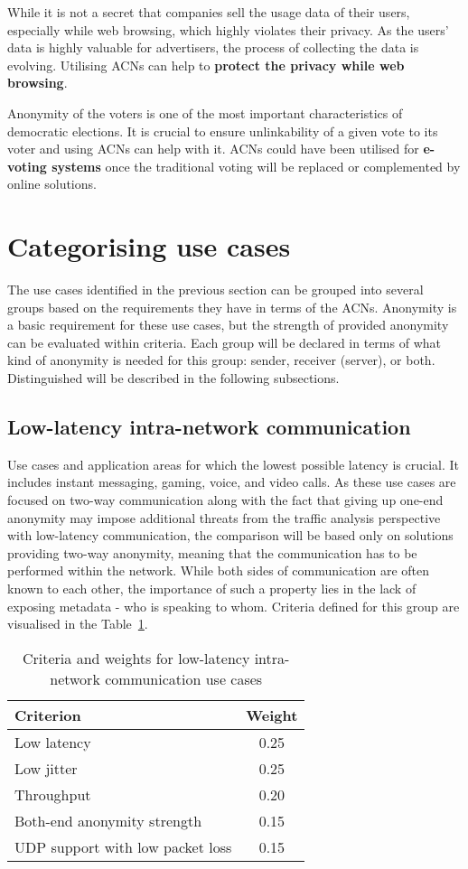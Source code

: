 While it is not a secret that companies sell the usage data of their users, especially while web browsing, which highly violates their privacy. As the users’ data is highly valuable for advertisers, the process of collecting the data is evolving. Utilising ACNs can help to \textbf{protect the privacy while web browsing}.

Anonymity of the voters is one of the most important characteristics of democratic elections. It is crucial to ensure unlinkability of a given vote to its voter and using ACNs can help with it. ACNs could have been utilised for \textbf{e-voting systems} once the traditional voting will be replaced or complemented by online solutions.


\section{Categorising use cases}
The use cases identified in the previous section can be grouped into several groups based on the requirements they have in terms of the ACNs. Anonymity is a basic requirement for these use cases, but the strength of provided anonymity can be evaluated within criteria. Each group will be declared in terms of what kind of anonymity is needed for this group: sender, receiver (server), or both. Distinguished will be described in the following subsections.

\subsection{Low-latency intra-network communication}
Use cases and application areas for which the lowest possible latency is crucial. It includes instant messaging, gaming, voice, and video calls.
As these use cases are focused on two-way communication along with the fact that giving up one-end anonymity may impose additional threats from the traffic analysis perspective with low-latency communication, the comparison will be based only on solutions providing two-way anonymity, meaning that the communication has to be performed within the network. While both sides of communication are often known to each other, the importance of such a property lies in the lack of exposing metadata - who is speaking to whom.
Criteria defined for this group are visualised in the Table~\ref{tab:low_latency_criteria}.

\begin{table}[!ht]
\centering
\caption{Criteria and weights for low-latency intra-network communication use cases}
\begin{tabular}{|l|c|}
\hline
\textbf{Criterion} & \textbf{Weight} \\
\hline
Low latency & 0.25 \\
Low jitter & 0.25 \\
Throughput & 0.20 \\
Both-end anonymity strength & 0.15 \\
UDP support with low packet loss & 0.15 \\
\hline
\end{tabular}
\label{tab:low_latency_criteria}
\end{table}

